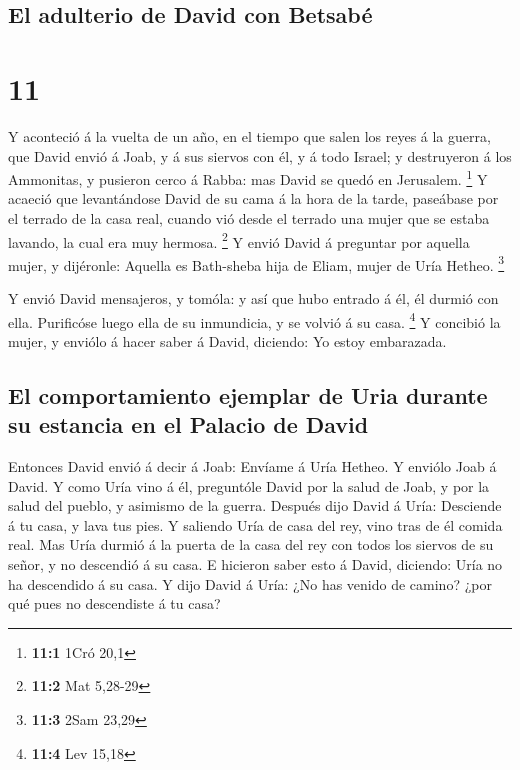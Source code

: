 \hypertarget{el-adulterio-de-david-con-betsabuxe9}{%
\subsection{El adulterio de David con
Betsabé}\label{el-adulterio-de-david-con-betsabuxe9}}

\hypertarget{section-10}{%
\section{11}\label{section-10}}

 Y aconteció á la vuelta de un año, en el tiempo que salen
los reyes á la guerra, que David envió á Joab, y á sus siervos con él, y
á todo Israel; y destruyeron á los Ammonitas, y pusieron cerco á Rabba:
mas David se quedó en Jerusalem. \footnote{\textbf{11:1} 1Cró 20,1}
 Y acaeció que levantándose David de su cama á la hora de
la tarde, paseábase por el terrado de la casa real, cuando vió desde el
terrado una mujer que se estaba lavando, la cual era muy hermosa.
\footnote{\textbf{11:2} Mat 5,28-29}  Y envió David á
preguntar por aquella mujer, y dijéronle: Aquella es Bath-sheba hija de
Eliam, mujer de Uría Hetheo. \footnote{\textbf{11:3} 2Sam 23,29}

 Y envió David mensajeros, y tomóla: y así que hubo
entrado á él, él durmió con ella. Purificóse luego ella de su
inmundicia, y se volvió á su casa. \footnote{\textbf{11:4} Lev 15,18}
 Y concibió la mujer, y enviólo á hacer saber á David,
diciendo: Yo estoy embarazada.

\hypertarget{el-comportamiento-ejemplar-de-uria-durante-su-estancia-en-el-palacio-de-david}{%
\subsection{El comportamiento ejemplar de Uria durante su estancia en el
Palacio de
David}\label{el-comportamiento-ejemplar-de-uria-durante-su-estancia-en-el-palacio-de-david}}

 Entonces David envió á decir á Joab: Envíame á Uría
Hetheo. Y enviólo Joab á David.  Y como Uría vino á él,
preguntóle David por la salud de Joab, y por la salud del pueblo, y
asimismo de la guerra.  Después dijo David á Uría:
Desciende á tu casa, y lava tus pies. Y saliendo Uría de casa del rey,
vino tras de él comida real.  Mas Uría durmió á la puerta
de la casa del rey con todos los siervos de su señor, y no descendió á
su casa.  E hicieron saber esto á David, diciendo: Uría
no ha descendido á su casa. Y dijo David á Uría: ¿No has venido de
camino? ¿por qué pues no descendiste á tu casa?

